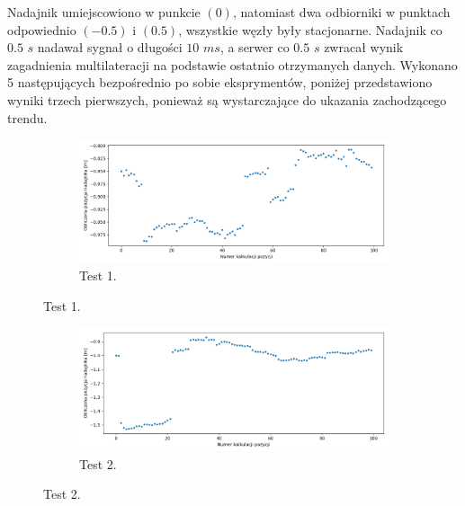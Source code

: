 Nadajnik umiejscowiono w punkcie $(0)$, natomiast dwa odbiorniki w punktach odpowiednio $(-0.5)$ i $(0.5)$, wszystkie węzły były stacjonarne. Nadajnik co $0.5$ $s$ nadawał sygnał o długości $10$ $ms$, a serwer co $0.5$ $s$ zwracał wynik zagadnienia multilateracji na podstawie ostatnio otrzymanych danych. Wykonano 5 następujących bezpośrednio po sobie eksprymentów, poniżej przedstawiono wyniki trzech pierwszych, ponieważ są wystarczające do ukazania zachodzącego trendu.

\begin{figure}[H]
    \centering
    \begin{subfigure}{\textwidth}\label{fig:position_0}
        \centering
        \includegraphics[width=0.95\linewidth]{pics/position/position_0.png}
        \caption{Test 1.}
    \end{subfigure}
\end{figure}
\begin{figure}[H]
    \ContinuedFloat\centering
    \begin{subfigure}{\textwidth}\label{fig:position_1}
        \centering
        \includegraphics[width=0.95\linewidth]{pics/position/position_1.png}
        \caption{Test 2.}
    \end{subfigure}
\end{figure}
